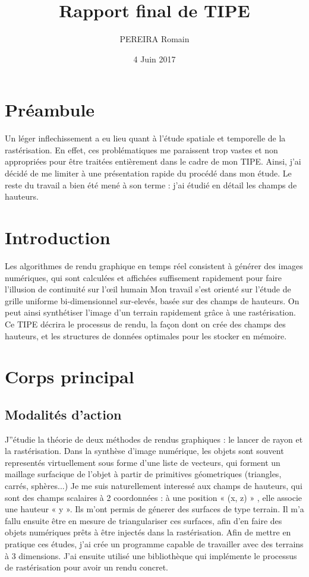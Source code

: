 \documentclass[12pt]{article}
\title{Rapport final de TIPE}
\author{PEREIRA Romain}
\date{4 Juin 2017}
\begin{document}
	\maketitle
	\tableofcontents
	
	\section*{Préambule}
		\hspace{10 mm}
		Un léger inflechissement a eu lieu quant à l'étude spatiale et temporelle de la rastérisation.
		En effet, ces problématiques me paraissent trop vastes et non appropriées pour être traitées entièrement dans le cadre de mon TIPE.
		Ainsi, j'ai décidé de me limiter à une présentation rapide du procédé dans mon étude.
		\newline
		Le reste du travail a bien été mené à son terme : j'ai étudié en détail les champs de hauteurs.


	\section{Introduction}
		\hspace{10 mm}
		Les algorithmes de rendu graphique en temps réel consistent à générer des images numériques, qui sont calculées et affichées suffisement rapidement pour faire l'illusion de continuité sur l'œil humain
		Mon travail s'est orienté sur l'étude de grille uniforme bi-dimensionnel sur-elevés, basée sur des champs de hauteurs. On peut ainsi synthétiser l'image d'un terrain rapidement grâce à une rastérisation.
		Ce TIPE décrira le processus de rendu, la façon dont on crée des champs des hauteurs, et les structures de données optimales pour les stocker en mémoire.

	\newpage
	\section{Corps principal}
		\subsection{Modalités d'action}	

		J''étudie la théorie de deux méthodes de rendus graphiques : le lancer de rayon et la rastérisation.
		Dans la synthèse d'image numérique, les objets sont souvent representés virtuellement sous forme d'une liste de vecteurs,
		qui forment un maillage surfacique de l'objet à partir de primitives géometriques (triangles, carrés, sphères...)
		 \newline
		 Je me suis naturellement interessé aux champs de hauteurs, qui sont des champs scalaires à 2 coordonnées : à une position « (x, z) » , elle associe une hauteur « y ».
		 Ils m'ont permis de génerer des surfaces de type terrain. 
		 Il m'a fallu ensuite être en mesure de triangulariser ces surfaces, afin d'en faire des objets numériques prêts à être injectés dans la rastérisation.
		\newline
		Afin de mettre en pratique ces études, j'ai crée un programme capable de travailler avec des terrains à 3 dimensions.
		J'ai ensuite utilisé une bibliothèque qui implémente le processus de rastérisation pour avoir un rendu concret.
 
\end{document}
